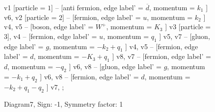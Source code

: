 \documentclass{revtex4}
\begin{document}
\begin{figure}[!htb]
\begin{center}
{    %
v1 [particle = \(1\)] -- [anti fermion, edge label' = \(\overline{d}\), momentum = \(k_{1}\) ] v6, 
v2 [particle = \(2\)] -- [fermion, edge label' = \(u\), momentum = \(k_{2}\) ] v4, 
v5 -- [boson, edge label' = \(W^{+}\), momentum = \(K_{3}\) ] v3 [particle = \(3\)], 
v4 -- [fermion, edge label' = \(u\), momentum = \(q_{1}\) ] v5, 
v7 -- [gluon, edge label' = \(g\), momentum = \(-k_{2} + q_{1}\) ] v4, 
v5 -- [fermion, edge label' = \(d\), momentum = \(-K_{3} + q_{1}\) ] v8, 
v7 -- [fermion, edge label' = \(d\), momentum = \(-q_{2}\) ] v6, 
v8 -- [gluon, edge label' = \(g\), momentum = \(-k_{1} + q_{2}\) ] v6, 
v8 -- [fermion, edge label' = \(d\), momentum = \(-k_{2} + q_{1} - q_{2}\) ] v7, 
};
\end{center}
\caption{Diagram7, Sign: -1, Symmetry factor: 1}
\end{figure}
\newpage
\end{document}
